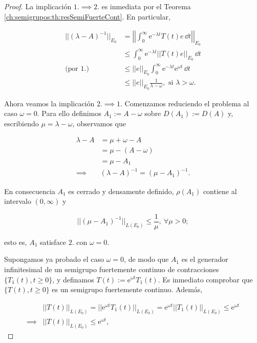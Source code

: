\begin{proof}
    La implicación $1. \implies 2.$ es inmediata por el Teorema \ref{ch:semigrupos:th:resSemiFuerteCont}. En particular,

    \begin{align*}
        ||(\lambda -A)^{-1}||_{E_0} &= \left | \left | \int_0^{\infty}\mathrm{e}^{-\lambda t}T(t)e \, \dd t \right | \right |_{E_0}\\
        &\leq \int_0^\infty \mathrm{e}^{-\lambda t} ||T(t)e||_{E_0} \, \dd t\\
        \text{(por }1.\text{)}&\leq||e||_{E_0}\int_0^\infty \mathrm{e}^{-\lambda t} \mathrm{e}^{\omega t} \, \dd t\\
        &\leq ||e||_{E_0} \frac{1}{\lambda - \omega}, \text{ si } \lambda > \omega.
    \end{align*}

    Ahora veamos la implicación $2. \implies 1.$ Comenzamos reduciendo el problema al caso $\omega = 0$. Para ello definimos $A_1 := A - \omega$ sobre $D(A_1) := D(A)$ y, escribiendo $\mu = \lambda - \omega$, observamos que

    \begin{align*}
        \lambda - A &= \mu + \omega - A\\
        &= \mu - (A - \omega)\\
        &= \mu - A_1\\
        \implies& (\lambda - A)^{-1} = (\mu - A_1)^{-1}.
    \end{align*}

    En consecuencia $A_1$ es cerrado y densamente definido, $\rho(A_1)$ contiene al intervalo $(0, \infty)$ y

    \[||(\mu - A_1)^{-1}||_{L(E_0)} \leq \frac{1}{\mu}, \ \forall \mu > 0;\]

    esto es, $A_1$ satisface $2.$ con $\omega = 0$.

    Supongamos ya probado el caso $\omega = 0$, de modo que $A_1$ es el generador infinitesimal de un semigrupo fuertemente continuo de contracciones $\{T_1(t), t \geq 0\}$, y definamos $T(t) := \mathrm{e}^{\omega t}T_1(t)$. Es inmediato comprobar que $\{T(t), t \geq 0\}$ es un semigrupo fuertemente continuo. Además,

    \begin{align*}
        &||T(t)||_{L(E_0)} = ||\mathrm{e}^{\omega t}T_1(t)||_{L(E_0)} = \mathrm{e}^{\omega t} ||T_1(t)||_{L(E_0)} \leq \mathrm{e}^{\omega t}\\
        \implies& ||T(t)||_{L(E_0)} \leq \mathrm{e}^{\omega t},
    \end{align*}


\end{proof}
